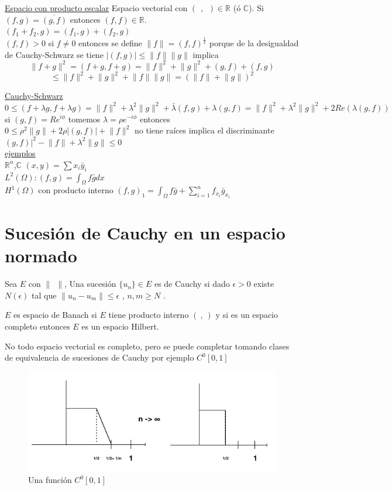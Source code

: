 \documentclass[a4paper,10pt]{book}
\def \ep{\epsilon}
\begin{document}
\underline{Espacio con producto escalar}
Espacio vectorial con $( \ \ , \ \ )  \in \mathbb{R}$ (ó $\mathbb{C}$). Si $(f,g)=\overline{(g,f)}$   
entonces $(f,f)\in \mathbb{R}$. \\

$(f_1+f_2,g)=(f_1,g)+(f_2,g)$  \\
$(f,f)>0$ si $f\neq 0$ entonces se define $\lVert f \rVert = (f,f)^{\frac{1}{2}}$ porque
de la desigualdad de Cauchy-Schwarz se tiene
$|(f,g)| \leq \lVert f \rVert \lVert g\rVert$ implica \\

\[\lVert f+g \rVert^2 = (f+g,f+g) =\lVert f\rVert^2 + \lVert g\rVert^2 + (g,f)+(f,g)\]
\[ \leq \lVert f\rVert^2 + \lVert g\rVert^2 + \lVert f \rVert\lVert g \rVert= \left( \lVert f\rVert + \lVert g\rVert  \right)^2 \]

\underline{Cauchy-Schwarz} \\
$0\leq (f+\lambda g, f + \lambda g) = \lVert f \rVert^2 +\lambda^2\lVert g \rVert^2 + \bar{\lambda} (f,g)+ \lambda (g,f)= \lVert f \rVert^2+ \lambda^2\lVert g \rVert^2 +2 Re (\lambda(g,f))$
si $(g,f)= R e^{i \phi} $ tomemos $\lambda= \rho e^{-i\phi}$  entonces\\
$0\leq \rho^2 \lVert g\rVert +2 \rho | (g,f) | + \lVert f\rVert^2 $
no tiene raíces implica el discriminante \\
$ (g,f) |^2 - \lVert f \rVert+ \lambda^2\lVert g \rVert \leq 0$\\
\underline{ejemplos} \\
$\mathbb{R}^n$,$\mathbb{C}$ $(x,y)= \sum\limits x_i \bar{y}_i$ \\
$L^2(\Omega) : (f,g) =\int_{\Omega} f \bar{g} dx$\\
$H^1(\Omega)$ con producto interno $(f,g)_1 = \int_{\Omega} f\bar{g} + \sum\limits_{i=1}^{n} f_{x_i} \bar{g}_{x_i}$

\section{Sucesión de Cauchy en un espacio normado}
Sea $E$ con $ \lVert \ \ \rVert$, Una sucesión $\{ u_n\}\in E$ es de Cauchy si dado $\epsilon>0$
existe $N(\epsilon)$ tal que $\lVert u_n -u_m\rVert \leq \ep $ , $n,m\geq N$ .

$E$ es espacio de Banach si $E$ tiene producto interno $(\ ,\ )$ y si es un espacio completo 
entonces $E$ es un espacio Hilbert.

No todo espacio vectorial es completo, pero se puede completar tomando clases de equivalencia de sucesiones
de Cauchy por ejemplo $C^0[0,1]$    
\begin{figure}[H]
    \centering
    \includegraphics[width=0.5\linewidth]{Screen Shot 2024-01-21 at 10.59.57.png}
    \caption{Una función $C^0[0,1]$ }
    \label{fig:1}
\end{figure}
\end{document}
